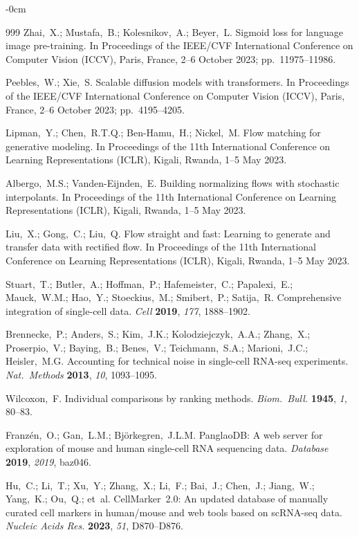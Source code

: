 \documentclass[11pt,a4paper]{article}
\newlength{\extralength}
\begin{document}
\begin{adjustwidth}{-\extralength}{0cm}
\begin{thebibliography}{999}
Zhai,~X.; Mustafa,~B.; Kolesnikov,~A.; Beyer,~L. Sigmoid loss for language image pre-training. In Proceedings of the IEEE/CVF International Conference on Computer Vision (ICCV), Paris, France, 2--6 October 2023; pp.\ 11975--11986.

Peebles,~W.; Xie,~S. Scalable diffusion models with transformers. In Proceedings of the IEEE/CVF International Conference on Computer Vision (ICCV), Paris, France, 2--6 October 2023; pp.\ 4195--4205.

Lipman,~Y.; Chen,~R.T.Q.; Ben-Hamu,~H.; Nickel,~M. Flow matching for generative modeling. In Proceedings of the 11th International Conference on Learning Representations (ICLR), Kigali, Rwanda, 1--5 May 2023.

Albergo,~M.S.; Vanden-Eijnden,~E. Building normalizing flows with stochastic interpolants. In Proceedings of the 11th International Conference on Learning Representations (ICLR), Kigali, Rwanda, 1--5 May 2023.

Liu,~X.; Gong,~C.; Liu,~Q. Flow straight and fast: Learning to generate and transfer data with rectified flow. In Proceedings of the 11th International Conference on Learning Representations (ICLR), Kigali, Rwanda, 1--5 May 2023.

Stuart,~T.; Butler,~A.; Hoffman,~P.; Hafemeister,~C.; Papalexi,~E.; Mauck,~W.M.; Hao,~Y.; Stoeckius,~M.; Smibert,~P.; Satija,~R. Comprehensive integration of single-cell data. {\em Cell} {\bf 2019}, {\em 177}, 1888--1902.

Brennecke,~P.; Anders,~S.; Kim,~J.K.; Kolodziejczyk,~A.A.; Zhang,~X.; Proserpio,~V.; Baying,~B.; Benes,~V.; Teichmann,~S.A.; Marioni,~J.C.; Heisler,~M.G. Accounting for technical noise in single-cell RNA-seq experiments. {\em Nat.\ Methods} {\bf 2013}, {\em 10}, 1093--1095.

Wilcoxon,~F. Individual comparisons by ranking methods. {\em Biom.\ Bull.} {\bf 1945}, {\em 1}, 80--83.

Franz\'{e}n,~O.; Gan,~L.M.; Bj\"{o}rkegren,~J.L.M. PanglaoDB: A web server for exploration of mouse and human single-cell RNA sequencing data. {\em Database} {\bf 2019}, {\em 2019}, baz046.

Hu,~C.; Li,~T.; Xu,~Y.; Zhang,~X.; Li,~F.; Bai,~J.; Chen,~J.; Jiang,~W.; Yang,~K.; Ou,~Q.; et~al. CellMarker~2.0: An updated database of manually curated cell markers in human/mouse and web tools based on scRNA-seq data. {\em Nucleic Acids Res.} {\bf 2023}, {\em 51}, D870--D876.


\end{thebibliography}
\end{adjustwidth}
\end{document}
